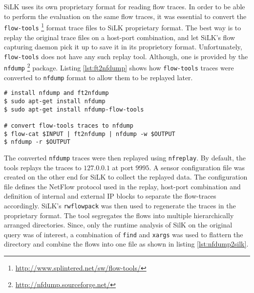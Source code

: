 SiLK uses its own proprietary format for reading flow traces. In order to be
able to perform the evaluation on the same flow traces, it was essential to
convert the \texttt{flow-tools}
\footnote{\url{http://www.splintered.net/sw/flow-tools/}} format trace files
to SiLK proprietary format. The best way is to replay the original trace files
on a  host-port combination, and let SiLK's
flow capturing daemon pick it up to save it in its proprietory format.
Unfortunately, \texttt{flow-tools} does not have any such replay tool.
Although, one is provided by the \texttt{nfdump}
\footnote{\url{http://nfdump.sourceforge.net/}} package. Listing
\ref{lst:ft2nfdump} shows how \texttt{flow-tools} traces were converted to
\texttt{nfdump} format to allow them to be replayed later.

\begin{lstlisting}
# install nfdump and ft2nfdump
$ sudo apt-get install nfdump
$ sudo apt-get install nfdump-flow-tools

# convert flow-tools traces to nfdump
$ flow-cat $INPUT | ft2nfdump | nfdump -w $OUTPUT
$ nfdump -r $OUTPUT
\end{lstlisting}

The converted \texttt{nfdump} traces were then replayed using
\texttt{nfreplay}. By default, the tools replays the traces to $127.0.0.1$ at
port $9995$. A sensor configuration file was created on the other end for SiLK
to collect the replayed data. The configuration file defines the NetFlow
protocol used in the replay, host-port combination and definition of internal
and external \ac{IP} blocks to separate  the
flow-traces accordingly. SiLK's \texttt{rwflowpack} was then used to regenerate
the traces in the proprietary format. The tool segregates the flows into
multiple hierarchically arranged directories. Since, only the runtime analysis
of SilK on the original query was of interest, a combination of \texttt{find}
and \texttt{xargs} was used to flattern the directory and combine the flows
into one file as shown in listing \ref{lst:nfdump2silk}.


